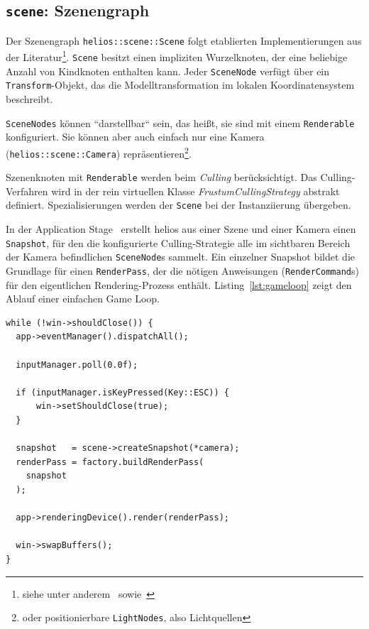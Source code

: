 \subsection*{\texttt{scene}: Szenengraph}
Der Szenengraph \texttt{helios::scene::Scene} folgt etablierten Implementierungen aus der Literatur\footnote{siehe unter anderem~\cite[]{She07} sowie~\cite[]{Gre19}}.
\texttt{Scene} besitzt einen impliziten Wurzelknoten, der eine beliebige Anzahl von Kindknoten enthalten kann.
Jeder \texttt{SceneNode} verfügt über ein \texttt{Transform}-Objekt, das die Modelltransformation im lokalen Koordinatensystem beschreibt.\par
\texttt{SceneNodes} können ``darstellbar`` sein, das heißt, sie sind mit einem \texttt{Renderable} konfiguriert.
Sie können aber auch einfach nur eine Kamera (\texttt{helios::scene::Camera}) repräsentieren\footnote{oder positionierbare \texttt{LightNodes}, also Lichtquellen}.\par
Szenenknoten mit \texttt{Renderable} werden beim \textit{Culling} berücksichtigt.
Das Culling-Verfahren wird in der rein virtuellen Klasse \textit{FrustumCullingStrategy} abstrakt definiert. Spezialisierungen werden der \texttt{Scene} bei der Instanziierung übergeben.\par
In der Application Stage~\cite[687]{Gre19} erstellt helios aus einer Szene und einer Kamera einen \texttt{Snapshot}, für den die konfigurierte Culling-Strategie alle im sichtbaren Bereich der Kamera befindlichen \texttt{SceneNode}s sammelt.
Ein einzelner Snapshot bildet die Grundlage für einen \texttt{RenderPass}, der die nötigen Anweisungen (\texttt{RenderCommand}s) für den eigentlichen Rendering-Prozess enthält.
Listing~\ref{lst:gameloop} zeigt den Ablauf einer einfachen Game Loop.


\begin{lstlisting}[style=c++style, caption={Implementierung einer einfachen Game Loop in helios. Von der Szene wird ein \texttt{Snapshot} erstellt, der als Grundlage für den \texttt{RenderPass} dient.}, label=lst:gameloop]
while (!win->shouldClose()) {
  app->eventManager().dispatchAll();

  inputManager.poll(0.0f);

  if (inputManager.isKeyPressed(Key::ESC)) {
      win->setShouldClose(true);
  }

  snapshot   = scene->createSnapshot(*camera);
  renderPass = factory.buildRenderPass(
    snapshot
  );

  app->renderingDevice().render(renderPass);

  win->swapBuffers();
}
\end{lstlisting}



